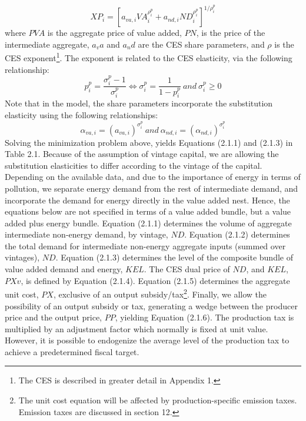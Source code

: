 \documentclass{article}
\begin{document}
$$
X\!P_i = \left[a_{va,i}V\!A_{i}^{\rho_{i}^{p}}+a_{nd,i}N\!D_{i}^{\rho_{i}^p}\right]^{1/\rho_i^p}
$$
where $PVA$ is the aggregate price of value added, $PN$, is the price of the intermediate aggregate, $a_va$ and $a_nd$ are the CES share parameters, and $\rho$ is the CES exponent\footnote{The CES is described in greater detail in Appendix 1.}. The exponent is related to the CES elasticity, via the following relationship:
$$
p_i^p = \frac{\sigma_i^p-1}{\sigma_i^p}\Longleftrightarrow \sigma_i^p = \frac{1}{1-p_i^p} \ and \ \sigma_i^p \ge 0
$$
Note that in the model, the share parameters incorporate the substitution elasticity using the following relationships:
$$
\alpha_{va,i} = (a_{va,i})^{\sigma_i^p} \ and \ \alpha_{nd,i} = (\alpha_{nd,i})^{\sigma_i^p}
$$
Solving the minimization problem above, yields Equations (2.1.1) and (2.1.3) in Table 2.1. Because of the assumption of vintage capital, we are allowing the substitution elasticities to differ according to the vintage of the capital. Depending on the available data, and due to the importance of energy in terms of pollution, we separate energy demand from the rest of intermediate demand, and incorporate the demand for energy directly in the value added nest. Hence, the equations below are not specified in terms of a value added bundle, but a value added plus energy bundle. Equation (2.1.1) determines the volume of aggregate intermediate non-energy demand, by vintage, $ND$. Equation (2.1.2) determines the total demand for intermediate non-energy aggregate inputs (summed over vintages), $ND$. Equation (2.1.3) determines the level of the composite bundle of value added demand and energy, $KEL$. The CES dual price of $ND$, and $KEL$, $PXv$, is defined by Equation (2.1.4). Equation (2.1.5) determines the aggregate unit cost, $PX$, exclusive of an output subsidy/tax\footnote{The unit cost equation will be affected by production-specific emission taxes. Emission taxes are discussed in section 12.}. Finally, we allow the possibility of an output subsidy or tax, generating a wedge between the producer price and the output price, $PP$, yielding Equation (2.1.6). The production tax is multiplied by an adjustment factor which normally is fixed at unit value. However, it is possible to endogenize the average level of the production tax to achieve a predetermined fiscal target.

\newpage
\end{document}
